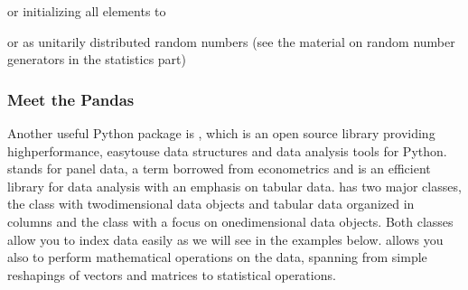 \documentclass[letterpaper,10pt,english]{sphinxmanual}
\begin{document}
or initializing all elements to

\begin{sphinxVerbatim}[commandchars=\\\{\}]
   
  
     
\end{sphinxVerbatim}

or as unitarily distributed random numbers (see the material on random number generators in the statistics part)

\begin{sphinxVerbatim}[commandchars=\\\{\}]
   
  
   
\end{sphinxVerbatim}


\subsubsection{Meet the Pandas}
\label{\detokenize{chapter2:meet-the-pandas}}








Another useful Python package is
, which is an open source library
providing high\sphinxhyphen{}performance, easy\sphinxhyphen{}to\sphinxhyphen{}use data structures and data
analysis tools for Python.  stands for panel data, a term borrowed from econometrics and is an efficient library for data analysis with an emphasis on tabular data.
 has two major classes, the  class with two\sphinxhyphen{}dimensional data objects and tabular data organized in columns and the class  with a focus on one\sphinxhyphen{}dimensional data objects. Both classes allow you to index data easily as we will see in the examples below.
 allows you also to perform mathematical operations on the data, spanning from simple reshapings of vectors and matrices to statistical operations.
\end{document}
